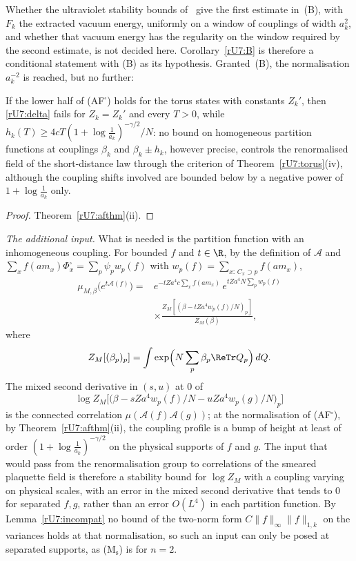 Whether the ultraviolet stability bounds of~\cite{Bal89b} give the first
estimate in~(B), with $F_k$ the extracted vacuum energy, uniformly on a
window of couplings of width $a_k^2$, and whether that vacuum energy has the
regularity on the window required by the second estimate, is not decided
here. Corollary~\ref{rU7:B} is therefore a conditional statement
with (B) as its hypothesis. Granted~(B), the normalisation $a_k^{-2}$ is
reached, but no further:

\begin{corollary}
\label{rU7:nogo}
If the lower half of \textup{(AF$^\square$)} holds for the torus states with
constants $Z_k'$, then \eqref{rU7:delta} fails for $Z_k=Z_k'$ and every $T>0$,
while $h_k(T)\ge4cT(1+\log\frac1{a_k})^{-\gamma/2}/N$: no bound on homogeneous
partition functions at couplings $\beta_k$ and $\beta_k\pm h_k$, however
precise, controls the renormalised field of the short-distance law through the
criterion of Theorem~\ref{rU7:torus}(iv), although the coupling shifts
involved are bounded below by a negative power of $1+\log\frac1{a_k}$
only.
\end{corollary}

\begin{proof}
Theorem~\ref{rU7:afthm}(ii).
\end{proof}

\emph{The additional input.} What is needed is the partition function with an
inhomogeneous coupling. For bounded $f$ and $t\in\R$, by the definition of
$\mathcal A$ and $\sum_xf(am_x)\Phi^\square_x=\sum_p\psi_pw_p(f)$ with
$w_p(f)=\sum_{x:\,C_x\supset p}f(am_x)$,
\begin{align*}
\mu_{M,\beta}\bigl(e^{t\mathcal A(f)}\bigr)={}&e^{-tZa^4c\sum_xf(am_x)}\,
e^{tZa^4N\sum_pw_p(f)}\\
&\times\frac{Z_M[(\beta-tZa^4w_p(f)/N)_p]}{Z_M(\beta)} ,
\end{align*}
where
\[
Z_M[(\beta_p)_p]=\int\exp\Bigl(N\sum_p\beta_p\ReTr Q_p\Bigr)\,dQ .
\]
The mixed second derivative in $(s,u)$ at $0$ of
\[
\log Z_M\bigl[\bigl(\beta-sZa^4w_p(f)/N-uZa^4w_p(g)/N\bigr)_p\bigr]
\]
is the connected correlation $\mu(\mathcal A(f)\mathcal A(g))$; at the
normalisation of (AF$^\square$), by Theorem~\ref{rU7:afthm}(ii), the coupling
profile is a bump of height at least of order
$(1+\log\frac1{a_k})^{-\gamma/2}$ on the physical supports of $f$ and $g$. The input that would pass
from the renormalisation group to correlations of the smeared plaquette field
is therefore a stability bound for $\log Z_M$ with a coupling varying on
physical scales, with an error in the mixed second derivative that tends to
$0$ for separated $f,g$, rather than an error $O(L^4)$ in each partition
function. By Lemma~\ref{rU7:incompat} no bound of the two-norm form
$C\|f\|_\infty\|f\|_{1,k}$ on the variances holds at that normalisation, so
such an input can only be posed at separated supports, as (M$_{\mathrm s}$)
is for $n=2$.

